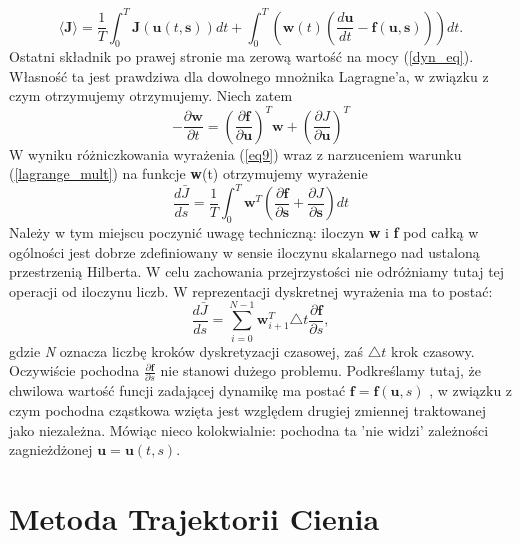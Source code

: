 \documentclass[12pt]{article}
\begin{document}
\begin{equation}\langle \textbf{J} \rangle = \frac{1}{T}\int_{0}^{T}\textbf{J}(\textbf{u}(t,\textbf{s}))dt + \int_{0}^{T}(\textbf{w}(t)(\frac{d\textbf{u}}{dt} -  \textbf{f}(\textbf{u},\textbf{s})))dt.
\label{eq9}
\end{equation}
Ostatni składnik po prawej stronie ma zerową wartość na mocy (\ref{dyn_eq}). Własność ta jest prawdziwa dla dowolnego mnożnika Lagragne'a, w związku z czym otrzymujemy otrzymujemy. Niech zatem
\begin{equation}
-\frac{\partial{\textbf{w}}}{\partial{t}} = (\frac{\partial{\textbf{f}}}{\partial{\textbf{u}}})^{T}\textbf{w} +(\frac{\partial{J}}{\partial{\textbf{u}}})^{T} 
\label{lagrange_mult}
\end{equation}
W wyniku różniczkowania wyrażenia (\ref{eq9}) wraz z narzuceniem warunku (\ref{lagrange_mult}) na funkcje \textbf{w}(t) otrzymujemy wyrażenie
\begin{equation}
\frac{d\bar{J}}{ds} = \frac{1}{T}\int_{0}^{T}\textbf{w}^{T}(\frac{\partial{\textbf{f}}}{\partial{\textbf{s}}} + \frac{\partial{J}}{\partial{\textbf{s}}})dt
\end{equation} 
Należy w tym miejscu poczynić uwagę techniczną: iloczyn \textbf{w} i \textbf{f} pod całką w ogólności jest dobrze zdefiniowany w sensie iloczynu skalarnego nad ustaloną przestrzenią Hilberta. W celu zachowania przejrzystości nie odróżniamy tutaj tej operacji od iloczynu liczb. \newline
W reprezentacji dyskretnej wyrażenia ma to postać: 
\begin{equation}
\frac{d\bar{J}}{ds} = \sum_{i=0}^{N-1}\textbf{w}_{i+1}^T\triangle t\frac{\partial\textbf{f}}{\partial s},
\end{equation} 
gdzie \textit{N} oznacza liczbę kroków dyskretyzacji czasowej, zaś $ \triangle t $ krok czasowy. \newline
Oczywiście pochodna $ \frac{\partial \textbf{f}}{\partial s} $ nie stanowi dużego problemu. Podkreślamy tutaj, że chwilowa wartość funcji zadającej dynamikę ma postać $ \textbf{f} = \textbf{f}(\textbf{u}, s)$ , w związku z czym pochodna cząstkowa wzięta jest względem drugiej zmiennej traktowanej jako niezależna. Mówiąc nieco kolokwialnie: pochodna ta 'nie widzi' zależności zagnieżdżonej $ \textbf{u} = \textbf{u}(t,s) $. 
\newpage
\section{Metoda Trajektorii Cienia}
\end{document}
